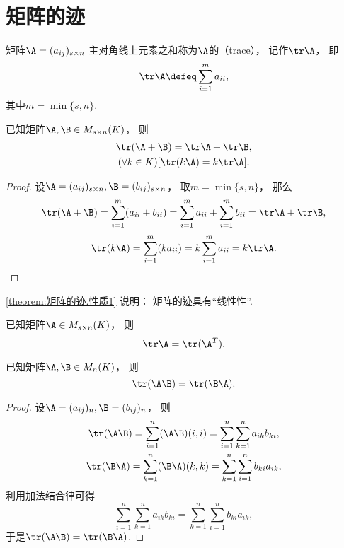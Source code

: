 \section{矩阵的迹}
\begin{definition}
矩阵\(\A=(a_{ij})_{s \times n}\)
主对角线上元素之和称为\(\A\)的（trace），
记作\(\tr\A\)，
即\[
	\tr\A
	\defeq
	\sum_{i=1}^m a_{ii},
\]
其中\(m = \min\{s,n\}\).
\end{definition}

\begin{property}\label{theorem:矩阵的迹.性质1}
已知矩阵\(\A,\B \in M_{s \times n}(K)\)，
则\begin{gather}
	\tr(\A+\B) = \tr\A + \tr\B, \\
	(\forall k \in K)[\tr(k \A) = k \tr\A].
\end{gather}
\begin{proof}
设\(\A=(a_{ij})_{s \times n},
\B=(b_{ij})_{s \times n}\)，
取\(m = \min\{s,n\}\)，
那么\[
	\tr(\A+\B) = \sum_{i=1}^m (a_{ii}+b_{ii})
	= \sum_{i=1}^m a_{ii}
	+ \sum_{i=1}^m b_{ii}
	= \tr\A + \tr\B,
\]\[
	\tr(k \A) = \sum_{i=1}^m (k a_{ii})
	= k \sum_{i=1}^m a_{ii}
	= k \tr\A.
	\qedhere
\]
\end{proof}
\end{property}
\begin{remark}
\cref{theorem:矩阵的迹.性质1} 说明：
矩阵的迹具有“线性性”.
\end{remark}

\begin{property}\label{theorem:矩阵的迹.矩阵转置不变迹}
已知矩阵\(\A \in M_{s \times n}(K)\)，
则\begin{equation}
	\tr\A = \tr(\A^T).
\end{equation}
\end{property}

\begin{property}\label{theorem:矩阵的迹.矩阵乘积交换次序不变迹}
已知矩阵\(\A,\B \in M_n(K)\)，
则\begin{equation}
	\tr(\A \B) = \tr(\B \A).
\end{equation}
\begin{proof}
设\(\A = (a_{ij})_n,
\B = (b_{ij})_n\)，
则\begin{gather*}
	\tr(\A \B)
	= \sum_{i=1}^n (\A \B)(i,i)
	= \sum_{i=1}^n \sum_{k=1}^n a_{ik} b_{ki}, \\
	\tr(\B \A)
	= \sum_{k=1}^n (\B \A)(k,k)
	= \sum_{k=1}^n \sum_{i=1}^n b_{ki} a_{ik},
\end{gather*}
利用加法结合律可得\[
	\sum_{i=1}^n \sum_{k=1}^n a_{ik} b_{ki}
	= \sum_{k=1}^n \sum_{i=1}^n b_{ki} a_{ik},
\]
于是\(\tr(\A \B) = \tr(\B \A)\).
\end{proof}
\end{property}

